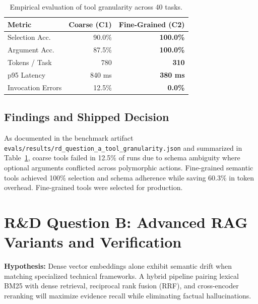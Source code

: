 \documentclass[10pt,a4paper,twocolumn]{article}
\begin{document}
\begin{table}[htbp]
\centering
\footnotesize
\setlength{\tabcolsep}{2pt}
\caption{Empirical evaluation of tool granularity across 40 tasks.}
\label{tab:tool_eval}
\begin{tabular*}{\columnwidth}{@{\extracolsep{\fill}}lrr@{}}
\toprule
\textbf{Metric} & \textbf{Coarse (C1)} & \textbf{Fine-Grained (C2)} \\
\midrule
Selection Acc.      & 90.0\%          & \textbf{100.0\%} \\
Argument Acc.       & 87.5\%          & \textbf{100.0\%} \\
Tokens / Task       & 780             & \textbf{310} \\
p95 Latency         & 840 ms          & \textbf{380 ms} \\
Invocation Errors   & 12.5\%          & \textbf{0.0\%} \\
\bottomrule
\end{tabular*}
\end{table}

\subsection{Findings and Shipped Decision}
As documented in the benchmark artifact \nolinkurl{evals/results/rd_question_a_tool_granularity.json} and summarized in Table~\ref{tab:tool_eval}, coarse tools failed in 12.5\% of runs due to schema ambiguity where optional arguments conflicted across polymorphic actions. Fine-grained semantic tools achieved 100\% selection and schema adherence while saving 60.3\% in token overhead. Fine-grained tools were selected for production.

\section{R\&D Question B: Advanced RAG Variants and Verification}
\label{sec:question_b}
\textbf{Hypothesis:} Dense vector embeddings alone exhibit semantic drift when matching specialized technical frameworks. A hybrid pipeline pairing lexical BM25 with dense retrieval, reciprocal rank fusion (RRF), and cross-encoder reranking will maximize evidence recall while eliminating factual hallucinations.
\end{document}
